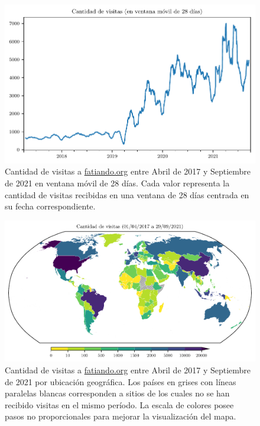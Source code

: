 \begin{figure}
    \centering
    \includegraphics[width=\linewidth]{figs/fatiando/users_history.pdf}
    \caption{
        Cantidad de visitas a \href{https://fatiando.org}{fatiando.org} entre
        Abril de 2017 y Septiembre de 2021 en ventana móvil de 28 días.
        Cada valor representa la cantidad de visitas recibidas en una ventana
        de 28 días centrada en su fecha correspondiente.
    }
    \label{fig:fatiando-users-history}
\end{figure}

\begin{figure}
    \centering
    \includegraphics[width=\linewidth]{figs/fatiando/users_map.pdf}
    \caption{
        Cantidad de visitas a \href{https://fatiando.org}{fatiando.org} entre
        Abril de 2017 y Septiembre de 2021 por ubicación geográfica.
        Los países en grises con líneas paralelas blancas corresponden a sitios
        de los cuales no se han recibido visitas en el mismo período.
        La escala de colores posee pasos no proporcionales para mejorar la
        visualización del mapa.
    }
    \label{fig:fatiando-users-map}
\end{figure}


